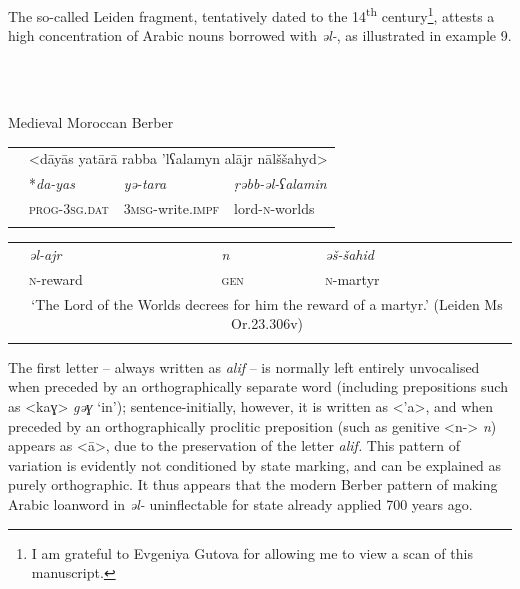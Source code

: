 \documentclass[output=paper]{langscibook}
\begin{document}
\begin{styleStandarduser}
The so-called Leiden fragment, tentatively dated to the 14\textsuperscript{th} century\footnote{I am grateful to Evgeniya Gutova for allowing me to view a scan of this manuscript.}, attests a high concentration of Arabic nouns borrowed with \textit{əl-}, as illustrated in example 9.
\end{styleStandarduser}

\begin{styleStandarduser}
\ea%
    \label{ex:key:9}
    \gll \\
         \\
    \glt
    \z %

          Medieval Moroccan Berber
\end{styleStandarduser}


\begin{tabularx}{\textwidth}{XXXX}
 & \multicolumn{3}{c}{<dāyās yatārā rabba ’lʕalamyn alājr nālššahyd>}\\
\lsptoprule
& *\textit{da-yas} & \textit{yə-tara} & \textit{ṛəbb-əl-ʕalamin}\\
& \textsc{prog-3sg.dat} & \textsc{3msg}{}-write.\textsc{impf} & lord-\textsc{n}{}-worlds\\
\lspbottomrule
\end{tabularx}

\begin{tabularx}{\textwidth}{XXXX}
 & \textit{əl-ajr} & \textit{n} & \textit{əš-šahid}\\
\lsptoprule
& \textsc{n}{}-reward & \textsc{gen} & \textsc{n}{}-martyr\\
& \multicolumn{3}{c}{‘The Lord of the Worlds decrees for him the reward of a martyr.’ (Leiden Ms Or.23.306v)}\\
\lspbottomrule
\end{tabularx}
\begin{styleStandarduser}
The first letter – always written as \textit{alif} – is normally left entirely unvocalised when preceded by an orthographically separate word (including prepositions such as <kaɣ> \textit{gəɣ} ‘in’); sentence-initially, however, it is written as <’a>, and when preceded by an orthographically proclitic preposition (such as genitive <n-> \textit{n}) appears as <ā>, due to the preservation of the letter \textit{alif.} This pattern of variation is evidently not conditioned by state marking, and can be explained as purely orthographic. It thus appears that the modern Berber pattern of making Arabic loanword in \textit{əl-} uninflectable for state already applied 700 years ago.
\end{styleStandarduser}
\end{document}
